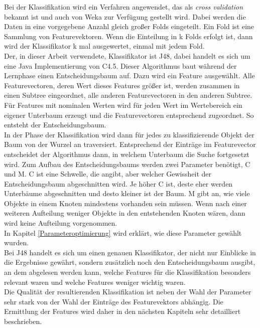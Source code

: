 Bei der Klassifikation wird ein Verfahren angewendet, das als \textit{cross validation} bekannt ist und auch von Weka zur Verfügung gestellt wird. Dabei werden die Daten in eine vorgegebene Anzahl gleich großer Folds eingeteilt. Ein Fold ist eine Sammlung von Featurevektoren. Wenn die Einteilung in k Folds erfolgt ist, dann wird der Klassifikator k mal ausgewertet, einmal mit jedem Fold.\\
Der, in dieser Arbeit verwendete, Klassifikator ist J48, dabei handelt es sich um eine Java Implementierung von C4.5.  Dieser Algorithmus baut während der Lernphase einen Entscheidungsbaum auf. Dazu wird ein Feature ausgewählt. Alle Featurevectoren, deren Wert dieses Features größer ist, werden zusammen in einen Subtree eingeordnet, alle anderen Featurevectoren in den anderen Subtree. Für Features mit nominalen Werten wird für jeden Wert im Wertebereich ein eigener Unterbaum erzeugt und die Featurevectoren entsprechend zugeordnet. So entsteht der Entscheidungsbaum.\\
In der Phase der Klassifikation wird dann für jedes zu klassifizierende Objekt der Baum von der Wurzel an traversiert. Entsprechend der Einträge im Featurevector entscheidet der Algorithmus dann, in welchem Unterbaum die Suche fortgesetzt wird. Zum Aufbau des Entscheidungsbaums werden zwei Parameter benötigt, C und M. C ist eine Schwelle, die angibt, aber welcher Gewissheit der Entscheidungsbaum abgeschnitten wird. Je höher C ist, deste eher werden Unterbäume abgeschnitten und desto kleiner ist der Baum. M gibt an, wie viele Objekte in einem Knoten mindestens vorhanden sein müssen. Wenn nach einer weiteren Aufteilung weniger Objekte in den entstehenden Knoten wären, dann wird keine Aufteilung vorgenommen.\cite[chapter 6.1]{Witten2011}\\
In Kapitel \ref{Parameteroptimierung} wird erklärt, wie diese Parameter gewählt wurden.\\
Bei J48 handelt es sich um einen genauen Klassifikator, der nicht nur Einblicke in die Ergebnisse gewährt, sondern zusätzlich noch den Entscheidungsbaum ausgibt, an dem abgelesen werden kann, welche Features für die Klassifikation besonders relevant waren und welche Features weniger wichtig waren.\\
Die Qualität der resultierenden Klassifikation ist neben der Wahl der Parameter sehr stark von der Wahl der Einträge des Featurevektors abhängig. Die Ermittlung der Features wird daher in den nächsten Kapiteln sehr detailliert beschrieben.\\